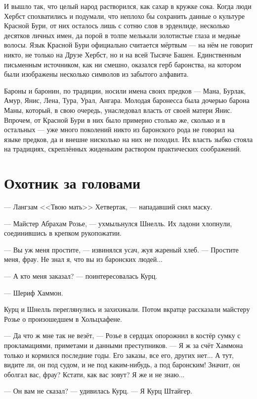 И вышло так, что целый народ растворился, как сахар в кружке сока.
Когда люди Хербст спохватились и подумали, что неплохо бы сохранить данные о культуре Красной Бури, от них осталось лишь с сотню слов в эрденлиде, несколько десятков личных имен, да порой в толпе мелькали золотистые глаза и медные волосы.
Язык Красной Бури официально считается мёртвым --- на нём не говорит никто, не только на Друзе Хербст, но и на всей Тысяче Башен.
Единственным письменным источником, как ни смешно, оказался герб баронства, на котором были изображены несколько символов из забытого алфавита.

Бароны и баронин, по традиции, носили имена своих предков --- Мана, Бурлак, Амур, Янис, Лена, Тура, Урал, Ангара.
Молодая баронесса была дочерью барона Маны, который, в свою очередь, унаследовал власть от своей матери Янис.
Впрочем, от Красной Бури в них было примерно столько же, сколько и в остальных --- уже много поколений никто из баронского рода не говорил на языке предков, да и внешне нисколько на них не походил.
Их власть зыбко стояла на традициях, скреплённых жиденьким раствором практических соображений.

\section{Охотник за головами}

--- Лангзам <<Твою мать>> Хетвертак, --- нападавший снял маску.

--- Майстер Абрахам Розье, --- ухмыльнулся Шнелль.
Их ладони хлопнули, соединившись в крепком рукопожатии.

\asterism

--- Вы уж меня простите, --- извинялся усач, жуя жареный хлеб.
--- Простите меня, фрау.
Не знал я, что вы из баронских людей...

--- А кто меня заказал? --- поинтересовалась Курц.

--- Шериф Хаммон.

Курц и Шнелль переглянулись и захихикали.
Потом вкратце рассказали майстеру Розье о произошедшем в Хольцхафене.

--- Да что ж мне так не везёт, --- Розье в сердцах опорожнил в костёр сумку с прокламациями, приметами и данными преступников.
--- Я ж за счёт Хаммона только и кормился последние годы.
Его заказы, все его, других нет...
А тут, видите ли, он под судом, и не под каким-нибудь, а под баронским!
Значит, он оболгал вас, фрау?
Кстати, как вас зовут?
Я же и не знаю...

--- Он вам не сказал? --- удивилась Курц.
--- Я Курц Штайгер.

